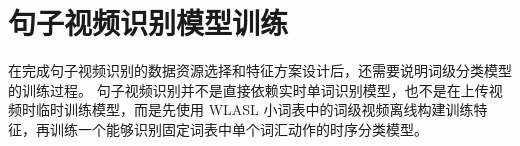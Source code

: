 \section{句子视频识别模型训练}

在完成句子视频识别的数据资源选择和特征方案设计后，还需要说明词级分类模型的训练过程。
句子视频识别并不是直接依赖实时单词识别模型，也不是在上传视频时临时训练模型，而是先使用 WLASL 小词表中的词级视频离线构建训练特征，再训练一个能够识别固定词表中单个词汇动作的时序分类模型。




